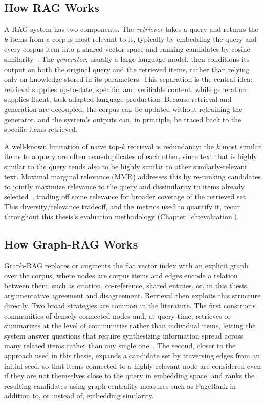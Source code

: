 \subsection{How RAG Works}
\label{sec:background-rag-howitworks}

A RAG system has two components. The \emph{retriever} takes a query and returns the $k$ items
from a corpus most relevant to it, typically by embedding the query and every corpus item into a
shared vector space and ranking candidates by cosine similarity~\cite{lewis2020rag}. The
\emph{generator}, usually a large language model, then conditions its output on both the original
query and the retrieved items, rather than relying only on knowledge stored in its parameters.
This separation is the central idea: retrieval supplies up-to-date, specific, and verifiable
content, while generation supplies fluent, task-adapted language production. Because retrieval and
generation are decoupled, the corpus can be updated without retraining the generator, and the
system's outputs can, in principle, be traced back to the specific items retrieved.

A well-known limitation of naive top-$k$ retrieval is redundancy: the $k$ most similar items to a
query are often near-duplicates of each other, since text that is highly similar to the query
tends also to be highly similar to other similarly-relevant text. Maximal marginal relevance
(MMR) addresses this by re-ranking candidates to jointly maximize relevance to the query and
dissimilarity to items already selected~\cite{carbonell1998mmr}, trading off some relevance for
broader coverage of the retrieved set. This diversity/relevance tradeoff, and the metrics used to
quantify it, recur throughout this thesis's evaluation methodology (Chapter~\ref{ch:evaluation}).

\subsection{How Graph-RAG Works}
\label{sec:background-graphrag-howitworks}

Graph-RAG replaces or augments the flat vector index with an explicit graph over the corpus,
where nodes are corpus items and edges encode a relation between them, such as citation,
co-reference, shared entities, or, in this thesis, argumentative agreement and disagreement.
Retrieval then exploits this structure directly. Two broad strategies are common in the
literature. The first constructs communities of densely connected nodes and, at query time,
retrieves or summarizes at the level of communities rather than individual items, letting the
system answer questions that require synthesizing information spread across many related items
rather than any single one~\cite{edge2024graphrag}. The second, closer to the approach used in
this thesis, expands a candidate set by traversing edges from an initial seed, so that items
connected to a highly relevant node are considered even if they are not themselves close to the
query in embedding space, and ranks the resulting candidates using graph-centrality measures such
as PageRank in addition to, or instead of, embedding similarity.

